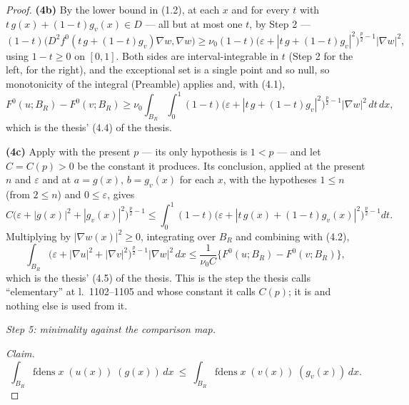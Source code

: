 \begin{proof}
\textbf{(4b)} By the lower bound in (1.2), at each $x$ and for every $t$ with
$t\,g(x)+(1-t)g_v(x)\in D$ --- all but at most one $t$, by Step 2 ---
\[
(1-t)\bigl(D^2f^0(t\,g+(1-t)g_v)\nabla w,\nabla w\bigr)
\ge\nu_0(1-t)\bigl(\varepsilon+|t\,g+(1-t)g_v|^2\bigr)^{\frac p2-1}|\nabla w|^2 ,
\]
using $1-t\ge0$ on $[0,1]$.  Both sides are interval-integrable in $t$ (Step 2
for the left,  for the right), and the
exceptional set is a single point and so null, so monotonicity of the integral
(Preamble) applies and, with (4.1),
\[
F^0(u;B_R)-F^0(v;B_R)
\ge\nu_0\int_{B_R}\int_0^1(1-t)\bigl(\varepsilon+|t\,g+(1-t)g_v|^2\bigr)^{\frac p2-1}
|\nabla w|^2\,dt\,dx ,
\tag{4.2}
\]
which is the thesis' (4.4) of the thesis.

\textbf{(4c)} Apply  with the present $p$
--- its only hypothesis is $1<p$ --- and let $C=C(p)>0$ be the constant it
produces.  Its conclusion, applied at the present $n$ and $\varepsilon$ and at
$a=g(x)$, $b=g_v(x)$ for each $x$, with the hypotheses $1\le n$ (from $2\le n$)
and $0\le\varepsilon$, gives
\[
C\bigl(\varepsilon+|g(x)|^2+|g_v(x)|^2\bigr)^{\frac p2-1}
\le\int_0^1(1-t)\bigl(\varepsilon+|t\,g(x)+(1-t)g_v(x)|^2\bigr)^{\frac p2-1}dt .
\]
Multiplying by $|\nabla w(x)|^2\ge0$, integrating over $B_R$ and combining with
(4.2),
\[
\int_{B_R}\bigl(\varepsilon+|\nabla u|^2+|\nabla v|^2\bigr)^{\frac p2-1}
|\nabla w|^2\,dx
\le\frac1{\nu_0C}\bigl\{F^0(u;B_R)-F^0(v;B_R)\bigr\} ,
\tag{4.3}
\]
which is the thesis' (4.5) of the thesis.  This is the step the thesis calls
``elementary'' at l.~1102--1105 and whose constant it calls $C(p)$; it is
 and nothing else is used from it.

\medskip
\noindent\emph{Step 5: minimality against the comparison map.}

\emph{Claim.}
\[
\int_{B_R}\mathrm{fdens}\;x\;(u(x))\;(g(x))\,dx
\ \le\ \int_{B_R}\mathrm{fdens}\;x\;(v(x))\;(g_v(x))\,dx .
\tag{5.1}
\]


\end{proof}
